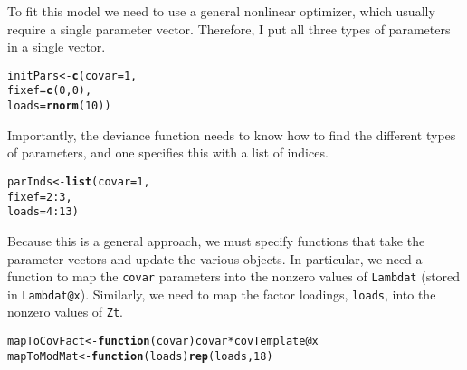 \documentclass[12pt]{article}\usepackage[]{graphicx}\usepackage[]{color}
\makeatletter
\newcommand{\hlnum}[1]{\textcolor[rgb]{0.686,0.059,0.569}{#1}}%
\newcommand{\hlopt}[1]{\textcolor[rgb]{0,0,0}{#1}}%
\newcommand{\hlstd}[1]{\textcolor[rgb]{0.345,0.345,0.345}{#1}}%
\newcommand{\hlkwa}[1]{\textcolor[rgb]{0.161,0.373,0.58}{\textbf{#1}}}%
\newcommand{\hlkwb}[1]{\textcolor[rgb]{0.69,0.353,0.396}{#1}}%
\newcommand{\hlkwc}[1]{\textcolor[rgb]{0.333,0.667,0.333}{#1}}%
\newcommand{\hlkwd}[1]{\textcolor[rgb]{0.737,0.353,0.396}{\textbf{#1}}}%
\newenvironment{kframe}{%
 \def\at@end@of@kframe{}%
 \ifinner\ifhmode%
  \def\at@end@of@kframe{\end{minipage}}%
  \begin{minipage}{\columnwidth}%
 \fi\fi%
 \def\FrameCommand##1{\hskip\@totalleftmargin \hskip-\fboxsep
 \colorbox{shadecolor}{##1}\hskip-\fboxsep
     \hskip-\linewidth \hskip-\@totalleftmargin \hskip\columnwidth}%
 \MakeFramed {\advance\hsize-\width
   \@totalleftmargin\z@ \linewidth\hsize
   \@setminipage}}%
 {\par\unskip\endMakeFramed%
 \at@end@of@kframe}
\newenvironment{knitrout}{}{} %
\makeatother
\begin{document}
To fit this model we need to use a general nonlinear optimizer, which
usually require a single parameter vector.  Therefore, I put all three
types of parameters in a single vector.
\begin{knitrout}
\color{fgcolor}\begin{kframe}
\begin{alltt}
\hlstd{initPars} \hlkwb{<-} \hlkwd{c}\hlstd{(}\hlkwc{covar} \hlstd{=} \hlnum{1}\hlstd{,}
              \hlkwc{fixef} \hlstd{=} \hlkwd{c}\hlstd{(}\hlnum{0}\hlstd{,} \hlnum{0}\hlstd{),}
              \hlkwc{loads} \hlstd{=} \hlkwd{rnorm}\hlstd{(}\hlnum{10}\hlstd{))}
\end{alltt}
\end{kframe}
\end{knitrout}
Importantly, the deviance function needs to know how to find the
different types of parameters, and one specifies this with a list of
indices.
\begin{knitrout}
\color{fgcolor}\begin{kframe}
\begin{alltt}
\hlstd{parInds} \hlkwb{<-} \hlkwd{list}\hlstd{(}\hlkwc{covar} \hlstd{=} \hlnum{1}\hlstd{,}
                \hlkwc{fixef} \hlstd{=} \hlnum{2}\hlopt{:}\hlnum{3}\hlstd{,}
                \hlkwc{loads} \hlstd{=} \hlnum{4}\hlopt{:}\hlnum{13}\hlstd{)}
\end{alltt}
\end{kframe}
\end{knitrout}
Because this is a general approach, we must specify functions that
take the parameter vectors and update the various objects.  In
particular, we need a function to map the \texttt{covar} parameters
into the nonzero values of \texttt{Lambdat} (stored in
\texttt{Lambdat@x}).  Similarly, we need to map the factor loadings,
\texttt{loads}, into the nonzero values of \texttt{Zt}.
\begin{knitrout}
\color{fgcolor}\begin{kframe}
\begin{alltt}
\hlstd{mapToCovFact} \hlkwb{<-} \hlkwa{function}\hlstd{(}\hlkwc{covar}\hlstd{) covar} \hlopt{*} \hlstd{covTemplate}\hlopt{@}\hlkwc{x}
\hlstd{mapToModMat} \hlkwb{<-} \hlkwa{function}\hlstd{(}\hlkwc{loads}\hlstd{)} \hlkwd{rep}\hlstd{(loads,} \hlnum{18}\hlstd{)}
\end{alltt}
\end{kframe}
\end{knitrout}
\end{document}
